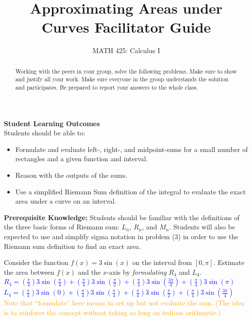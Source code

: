 \documentclass{ximera}
\title{Approximating Areas under Curves Facilitator Guide}
\author{MATH 425: Calculus I}
\begin{document}
\begin{abstract}
   Working with the peers in your group, solve the following problems. Make sure to show and justify all your work. Make sure everyone in the group understands the solution and participates. Be prepared to report your answers to the whole class. 
\end{abstract}
\maketitle

\textbf{Student Learning Outcomes}\\
Students should be able to: 
    \begin{itemize}
        \item Formulate and evaluate left-, right-, and midpoint-sums for a small number of rectangles and a given function and interval.
        \item Reason with the outputs of the sums.
        \item Use a simplified Riemann Sum definition of the integral to evaluate the exact area under a curve on an interval.
    \end{itemize}

\textbf{Prerequisite Knowledge:} Students should be familiar with the definitions of the three basic forms of Riemann sum: $L_n$, $R_n$, and $M_n$.  Students will also be expected to use and simplify sigma notation in problem (3) in order to use the Riemann sum definition to find an exact area.  

\begin{exercise}
    Consider the function $f(x)=3\sin(x)$ on the interval from $[0,\pi]$.  Estimate the area between $f(x)$ and the $x$-axis by \textit{formulating} $R_4$ and $L_4$.\\
    \textcolor{blue}{$R_4=(\frac{\pi}{4})3\sin(\frac{\pi}{4})+(\frac{\pi}{4})3\sin(\frac{\pi}{2})+(\frac{\pi}{4})3\sin(\frac{3\pi}{4})+(\frac{\pi}{4})3\sin(\pi)$\\%
    $L_4=(\frac{\pi}{4})3\sin(0)+(\frac{\pi}{4})3\sin(\frac{\pi}{4})+(\frac{\pi}{4})3\sin(\frac{\pi}{2})+(\frac{\pi}{4})3\sin(\frac{3\pi}{4})$\\}%
    \textcolor{orange}{Note that ``formulate'' here means to set up but not evaluate the sum.  (The idea is to reinforce the concept without taking so long on tedious arithmetic.)}
\end{exercise}
\end{document}
